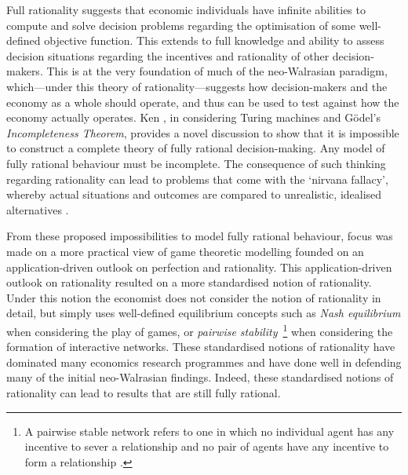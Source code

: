 Full rationality suggests that economic individuals have infinite abilities to compute and solve decision problems regarding the optimisation of some well-defined objective function. This extends to full knowledge and ability to assess decision situations regarding the incentives and rationality of other decision-makers. This is at the very foundation of much of the neo-Walrasian paradigm, which---under this theory of rationality---suggests how decision-makers and the economy as a whole should operate, and thus can be used to test against how the economy actually operates. Ken \citet{Binmore1987a, Binmore1987b}, in considering Turing machines and G\"{o}del's \emph{Incompleteness Theorem}, provides a novel discussion to show that it is impossible to construct a complete theory of fully rational decision-making. Any model of fully rational behaviour must be incomplete. The consequence of such thinking regarding rationality can lead to problems that come with the `nirvana fallacy', whereby actual situations and outcomes are compared to unrealistic, idealised alternatives \citep{Demsetz1969}.

From these proposed impossibilities to model fully rational behaviour, focus was made on a more practical view of game theoretic modelling founded on an application-driven outlook on perfection and rationality. This application-driven outlook on rationality resulted on a more standardised notion of rationality. Under this notion the economist does not consider the notion of rationality in detail, but simply uses well-defined equilibrium concepts such as \emph{Nash equilibrium} \citep{Nash1951} when considering the play of games, or \emph{pairwise stability}~\footnote{A pairwise stable network refers to one in which no individual agent has any incentive to sever a relationship and no pair of agents have any incentive to form a relationship \citep{JacksonWolinsky1996, JacksonWatts2002WP}.} when considering the formation of interactive networks. These standardised notions of rationality have dominated many economics research programmes and have done well in defending many of the initial neo-Walrasian findings. Indeed, these standardised notions of rationality can lead to results that are still fully rational.

